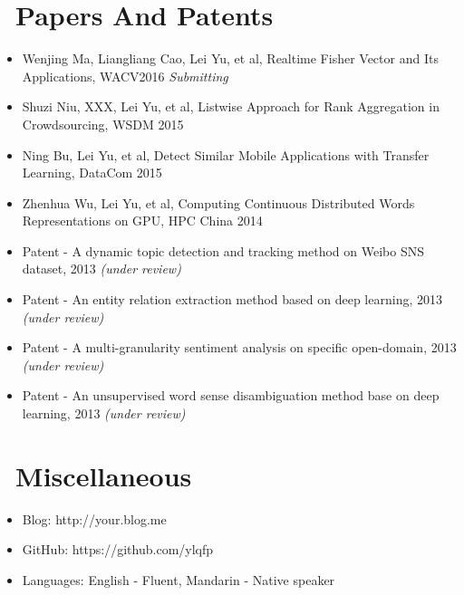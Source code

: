 \documentclass{resume}
\begin{document}
\section{\faBook\ Papers And Patents}
\begin{itemize}[parsep=0.5ex]
  \item Wenjing Ma, Liangliang Cao, Lei Yu, et al, Realtime Fisher Vector and Its Applications, WACV2016 \textit{Submitting}
  \item Shuzi Niu, XXX, Lei Yu, et al, Listwise Approach for Rank Aggregation in Crowdsourcing, WSDM 2015
  \item Ning Bu, Lei Yu, et al, Detect Similar Mobile Applications with Transfer Learning, DataCom 2015
  \item Zhenhua Wu, Lei Yu, et al, Computing Continuous Distributed Words Representations on GPU, HPC China 2014
  \item Patent - A dynamic topic detection and tracking method on Weibo SNS dataset, 2013 \textit{(under review)}
  \item Patent - An entity relation extraction method based on deep learning, 2013 \textit{(under review)}
  \item Patent - A multi-granularity sentiment analysis on specific open-domain, 2013 \textit{(under review)}
  \item Patent - An unsupervised word sense disambiguation method base on deep learning, 2013 \textit{(under review)}
\end{itemize}


\section{\faInfo\ Miscellaneous}
\begin{itemize}[parsep=0.5ex]
  \item Blog: http://your.blog.me
  \item GitHub: https://github.com/ylqfp
  \item Languages: English - Fluent, Mandarin - Native speaker
\end{itemize}

%
%
\end{document}
